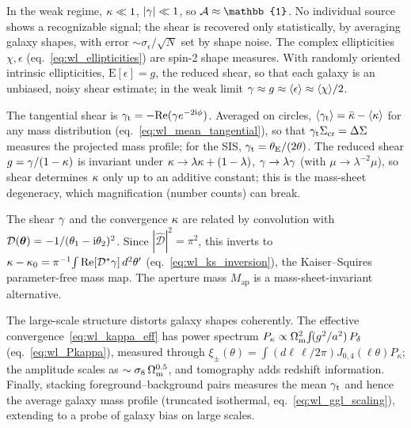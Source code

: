 In the weak regime, $\kappa \ll 1$, $|\gamma| \ll 1$, so
$\Amat \approx \mathbb{1}$.  No individual source shows a
recognizable signal; the shear is recovered only statistically,
by averaging galaxy shapes, with error
$\sim\sigma_\epsilon/\sqrt{N}$ set by shape noise.  The complex
ellipticities $\chi, \epsilon$ (eq.~\ref{eq:wl_ellipticities}) are spin-2
shape measures.  With randomly oriented intrinsic ellipticities,
$\mathrm{E}[\epsilon] = g$, the reduced shear, so that each galaxy is
an unbiased, noisy shear estimate; in the weak limit
$\gamma \approx g \approx \langle\epsilon\rangle \approx
\langle\chi\rangle/2$.

The tangential shear is $\gamma_{\mathrm t} =
-\mathrm{Re}(\gamma e^{-2\mathrm i\phi})$.  Averaged on circles,
$\langle\gamma_{\mathrm t}\rangle = \bar\kappa -
\langle\kappa\rangle$ for any mass distribution
(eq.~\ref{eq:wl_mean_tangential}), so that
$\gamma_{\mathrm t}\Sigma_{\mathrm{cr}} = \Delta\Sigma$ measures the
projected mass profile; for the SIS,
$\gamma_{\mathrm t} = \theta_{\mathrm{E}}/(2\theta)$.  The reduced shear
$g = \gamma/(1-\kappa)$ is
invariant under $\kappa \to \lambda\kappa + (1-\lambda)$,
$\gamma \to \lambda\gamma$ (with $\mu \to \lambda^{-2}\mu$),
so shear determines $\kappa$ only up to an additive constant; this is
the mass-sheet degeneracy, which magnification (number counts) can
break.

The shear $\gamma$ and the convergence $\kappa$ are related by
convolution with $\mathcal{D}(\boldsymbol{\theta}) =
-1/(\theta_1 - \mathrm i\theta_2)^2$.  Since
$|\hat{\mathcal D}|^2 = \pi^2$, this inverts to
$\kappa - \kappa_0 = \pi^{-1}\!\int
\mathrm{Re}[\mathcal D^*\gamma]\,d^2\theta'$
(eq.~\ref{eq:wl_ks_inversion}), the Kaiser--Squires parameter-free mass
map.  The aperture mass $M_{\mathrm{ap}}$ is a mass-sheet-invariant
alternative.

The large-scale structure distorts galaxy shapes coherently.  The
effective convergence~\eqref{eq:wl_kappa_eff} has power spectrum
$P_\kappa \propto \Omega_{\mathrm{m}}^2\!\int\! (g^2/a^2)\, P_\delta$
(eq.~\ref{eq:wl_Pkappa}), measured through $\xi_\pm(\theta) =
\int (d\ell\,\ell/2\pi) J_{0,4}(\ell\theta) P_\kappa$; the amplitude
scales as $\sim \sigma_8\,\Omega_{\mathrm{m}}^{0.5}$, and tomography adds redshift
information.  Finally, stacking foreground--background
pairs measures the mean $\gamma_{\mathrm t}$ and hence the
average galaxy mass profile (truncated isothermal,
eq.~\ref{eq:wl_ggl_scaling}), extending to a probe of galaxy
bias on large scales.



